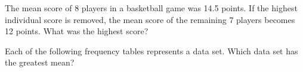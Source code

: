 \vspace{0.5em}


\vspace{2em}
\noindent\markforreview
\vspace{1em}

The mean score of 8 players in a basketball game was 14.5 points. If the highest individual score is removed, the mean score of the remaining 7 players becomes 12 points.  
What was the highest score?

\vspace{0.75em}


\vspace{2em}

\newpage
\noindent\markforreview
\vspace{1em}

Each of the following frequency tables represents a data set. Which data set has the greatest mean?

\vspace{0.75em}




